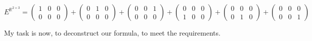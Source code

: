 \documentclass[a4paper]{article}
\begin{document}
\begin{displaymath}
E^{\mathbb{R}^{2\times{3}}} =
\begin{pmatrix}1&0&0\\0&0&0\end{pmatrix}+
\begin{pmatrix}0&1&0\\0&0&0\end{pmatrix}+
\begin{pmatrix}0&0&1\\0&0&0\end{pmatrix}+
\begin{pmatrix}0&0&0\\1&0&0\end{pmatrix}+
\begin{pmatrix}0&0&0\\0&1&0\end{pmatrix}+
\begin{pmatrix}0&0&0\\0&0&1\end{pmatrix}

\end{displaymath}

My task is now, to deconstruct our formula, to meet the requirements. 
\end{document}
